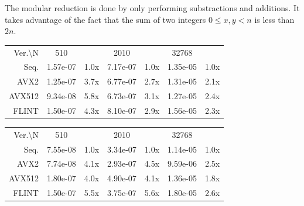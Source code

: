 \documentclass[a4paper]{article}
\begin{document}
\begin{remark}
    The modular reduction is done by only performing substractions and additions. It takes advantage of
    the fact that the sum of two integers $0 \leq x,y < n$ is less than $2n$.
\end{remark}

\begin{table}[h!]
    \centering
    
    \begin{tabular}{|r|*{3}{c c|}}
        \hline
        \rowcolor{myGray} 
        \multicolumn{7}{|c|}{\textsc{Cascade Lake}} \\
        \hline
        \rowcolor{myGray}
        Ver.\textbackslash N & 510 & & 2010 & & 32768 & \\
        \hline
        \cellcolor{myGray} Seq. & 1.57e-07 & 1.0x & 7.17e-07 & 1.0x & 1.35e-05 & 1.0x \\
        \hline
        \cellcolor{myGray} AVX2 & 1.25e-07 & 3.7x & 6.77e-07 & 2.7x & 1.31e-05 & 2.1x \\
        \hline
        \cellcolor{myGray} AVX512 & 9.34e-08 & 5.8x & 6.73e-07 & 3.1x & 1.27e-05 & 2.4x \\
        \hline
        \cellcolor{myGray} FLINT & 1.50e-07 & 4.3x & 8.10e-07 & 2.9x & 1.56e-05 & 2.3x \\
        \hline
    \end{tabular}

    \begin{tabular}{|r|*{3}{c c|}}
        \hline
        \rowcolor{myGray} 
        \multicolumn{7}{|c|}{\textsc{Ice Lake}} \\
        \hline
        \rowcolor{myGray}
        Ver.\textbackslash N & 510 & & 2010 & & 32768 & \\
        \hline
        \cellcolor{myGray} Seq. & 7.55e-08 & 1.0x & 3.34e-07 & 1.0x & 1.14e-05 & 1.0x \\
        \hline
        \cellcolor{myGray} AVX2 & 7.74e-08 & 4.1x & 2.93e-07 & 4.5x & 9.59e-06 & 2.5x \\
        \hline
        \cellcolor{myGray} AVX512 & 1.80e-07 & 4.0x & 4.90e-07 & 4.1x & 1.36e-05 & 1.8x \\
        \hline
        \cellcolor{myGray} FLINT & 1.50e-07 & 5.5x & 3.75e-07 & 5.6x & 1.80e-05 & 2.6x \\
        \hline
    \end{tabular}


\end{table}
\end{document}
